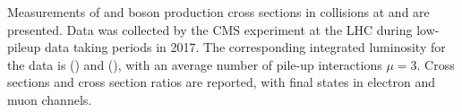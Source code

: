 % 
% 
%

Measurements of \W and \Z boson production cross sections in \pp collisions at \sg and \sh are presented. Data was collected by the CMS experiment at the LHC during low-pileup data taking periods in 2017. The corresponding integrated luminosity for the data is \lumig (\sg) and \lumih (\sh), with an average number of pile-up interactions $\mu=3$. Cross sections and cross section ratios are reported, with final states in electron and muon channels. 

